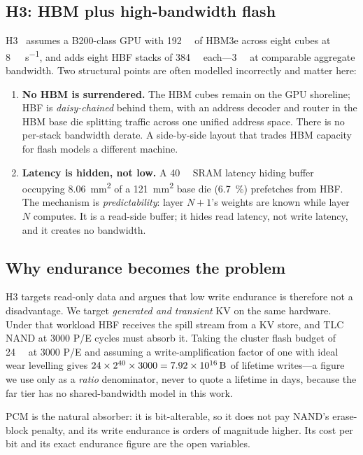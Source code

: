 \documentclass[conference]{IEEEtran}
\begin{document}
\subsection{H3: HBM plus high-bandwidth flash}
H3~\cite{h3} assumes a B200-class GPU with \SI{192}{\giga\byte} of HBM3e across
eight cubes at \SI{8}{\tera\byte\per\second}, and adds eight HBF stacks of
\SI{384}{\giga\byte} each---\SI{3}{\tera\byte} at comparable aggregate
bandwidth. Two structural points are often modelled incorrectly and matter here:

\begin{enumerate}
  \item \textbf{No HBM is surrendered.} The HBM cubes remain on the GPU
        shoreline; HBF is \emph{daisy-chained} behind them, with an address
        decoder and router in the HBM base die splitting traffic across one
        unified address space. There is no per-stack bandwidth derate. A
        side-by-side layout that trades HBM capacity for flash models a
        different machine.
  \item \textbf{Latency is hidden, not low.} A \SI{40}{\mega\byte} SRAM latency
        hiding buffer occupying \SI{8.06}{\milli\meter\squared} of a
        \SI{121}{\milli\meter\squared} base die (\SI{6.7}{\percent}) prefetches
        from HBF. The mechanism is \emph{predictability}: layer $N{+}1$'s
        weights are known while layer $N$ computes. It is a read-side buffer; it
        hides read latency, not write latency, and it creates no bandwidth.
\end{enumerate}

\subsection{Why endurance becomes the problem}
H3 targets read-only data and argues that low write endurance is therefore not a
disadvantage. We target \emph{generated and transient} KV on the same hardware.
Under that workload HBF receives the spill stream from a KV store, and TLC NAND
at \num{3000} P/E cycles must absorb it. Taking the cluster flash budget of
\SI{24}{\tebi\byte} at \num{3000} P/E and assuming a write-amplification factor
of one with ideal wear levelling gives
$24 \times 2^{40} \times 3000 = \SI{7.92e16}{\byte}$ of lifetime writes---a
figure we use only as a \emph{ratio} denominator, never to quote a lifetime in
days, because the far tier has no shared-bandwidth model in this work.

PCM is the natural absorber: it is bit-alterable, so it does not pay NAND's
erase-block penalty, and its write endurance is orders of magnitude higher.
Its cost per bit and its exact endurance figure are the open variables.
\end{document}
